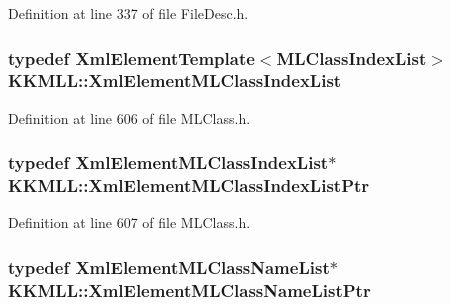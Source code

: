 Definition at line 337 of file File\+Desc.\+h.

\subsubsection[{\texorpdfstring{Xml\+Element\+M\+L\+Class\+Index\+List}{XmlElementMLClassIndexList}}]{\setlength{\rightskip}{0pt plus 5cm}typedef {\bf Xml\+Element\+Template}$<${\bf M\+L\+Class\+Index\+List}$>$ {\bf K\+K\+M\+L\+L\+::\+Xml\+Element\+M\+L\+Class\+Index\+List}}\hypertarget{namespace_k_k_m_l_l_ab6be913329de7423763ce83818e6277c}{}\label{namespace_k_k_m_l_l_ab6be913329de7423763ce83818e6277c}


Definition at line 606 of file M\+L\+Class.\+h.

\subsubsection[{\texorpdfstring{Xml\+Element\+M\+L\+Class\+Index\+List\+Ptr}{XmlElementMLClassIndexListPtr}}]{\setlength{\rightskip}{0pt plus 5cm}typedef {\bf Xml\+Element\+M\+L\+Class\+Index\+List}$\ast$ {\bf K\+K\+M\+L\+L\+::\+Xml\+Element\+M\+L\+Class\+Index\+List\+Ptr}}\hypertarget{namespace_k_k_m_l_l_a587d3d3b59054794bc2b9c10a11a16dc}{}\label{namespace_k_k_m_l_l_a587d3d3b59054794bc2b9c10a11a16dc}


Definition at line 607 of file M\+L\+Class.\+h.

\subsubsection[{\texorpdfstring{Xml\+Element\+M\+L\+Class\+Name\+List\+Ptr}{XmlElementMLClassNameListPtr}}]{\setlength{\rightskip}{0pt plus 5cm}typedef {\bf Xml\+Element\+M\+L\+Class\+Name\+List}$\ast$ {\bf K\+K\+M\+L\+L\+::\+Xml\+Element\+M\+L\+Class\+Name\+List\+Ptr}}\hypertarget{namespace_k_k_m_l_l_a22d8eb5a56c122a678ff62dceb9cf66a}{}\label{namespace_k_k_m_l_l_a22d8eb5a56c122a678ff62dceb9cf66a}


